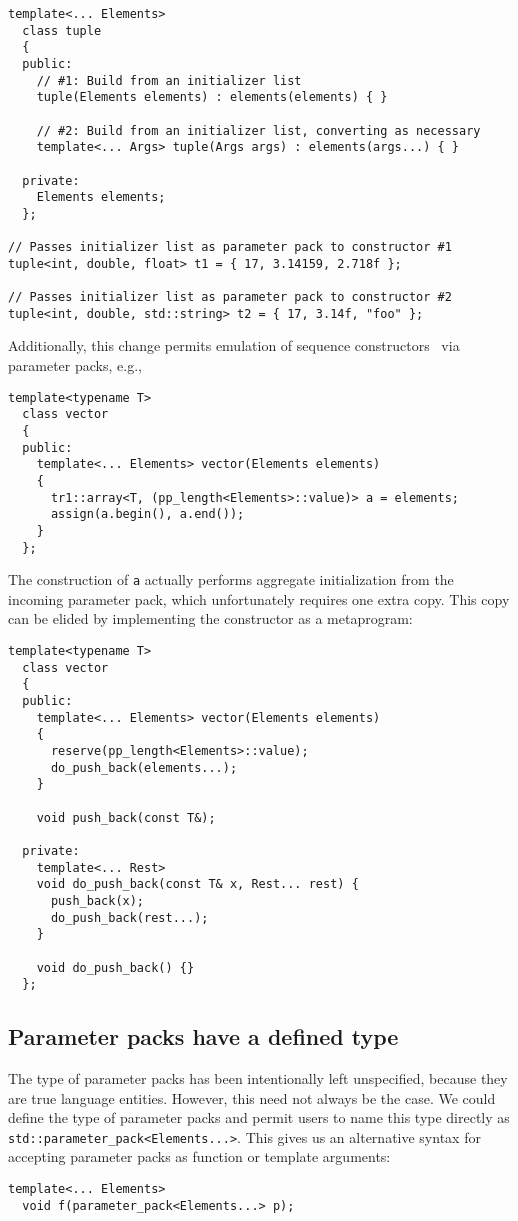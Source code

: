 \documentclass{article}
\begin{document}
\begin{verbatim}
template<... Elements>
  class tuple
  {
  public:
    // #1: Build from an initializer list
    tuple(Elements elements) : elements(elements) { }

    // #2: Build from an initializer list, converting as necessary
    template<... Args> tuple(Args args) : elements(args...) { }

  private:
    Elements elements;
  };

// Passes initializer list as parameter pack to constructor #1
tuple<int, double, float> t1 = { 17, 3.14159, 2.718f };
  
// Passes initializer list as parameter pack to constructor #2
tuple<int, double, std::string> t2 = { 17, 3.14f, "foo" };
\end{verbatim}

Additionally, this change permits emulation of sequence
constructors~\cite{DoReStr03} via parameter packs, e.g.,
\begin{verbatim}
template<typename T>
  class vector
  {
  public:
    template<... Elements> vector(Elements elements)
    {
      tr1::array<T, (pp_length<Elements>::value)> a = elements;
      assign(a.begin(), a.end());
    }
  };
\end{verbatim}

The construction of \texttt{a} actually performs aggregate
initialization from the incoming parameter pack, which unfortunately
requires one extra copy. This copy can be elided by implementing the
constructor as a metaprogram:

\begin{verbatim}
template<typename T>
  class vector
  {
  public:
    template<... Elements> vector(Elements elements)
    {
      reserve(pp_length<Elements>::value);
      do_push_back(elements...);
    }

    void push_back(const T&);

  private:
    template<... Rest>
    void do_push_back(const T& x, Rest... rest) {
      push_back(x);
      do_push_back(rest...);
    }

    void do_push_back() {}
  };
\end{verbatim}

\subsection{Parameter packs have a defined type}
The type of parameter packs has been intentionally left unspecified,
because they are true language entities. However, this need not always
be the case. We could define the type of parameter packs and permit
users to name this type directly as
\texttt{std::parameter\_pack<Elements...>}. This gives us an
alternative syntax for accepting parameter packs as function or
template arguments: 
\begin{verbatim}
template<... Elements>
  void f(parameter_pack<Elements...> p);
\end{verbatim}
\end{document}
